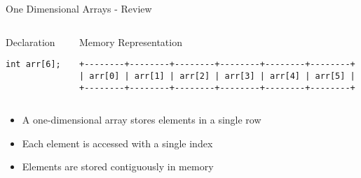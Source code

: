 \documentclass{beamer}
\begin{document}
\begin{frame}{One Dimensional Arrays - Review}
    \begin{columns}
        \begin{column}{0.5\textwidth}
            \begin{block}{Declaration}
                \begin{lstlisting}
int arr[6];
                \end{lstlisting}
            \end{block}
        \end{column}
        \begin{column}{0.5\textwidth}
            \begin{block}{Memory Representation}
                \begin{lstlisting}
+--------+--------+--------+--------+--------+--------+
| arr[0] | arr[1] | arr[2] | arr[3] | arr[4] | arr[5] |
+--------+--------+--------+--------+--------+--------+
                \end{lstlisting}
            \end{block}
        \end{column}
    \end{columns}
    
    \begin{itemize}
        \item A one-dimensional array stores elements in a single row
        \item Each element is accessed with a single index
        \item Elements are stored contiguously in memory
    \end{itemize}
\end{frame}
\end{document}
